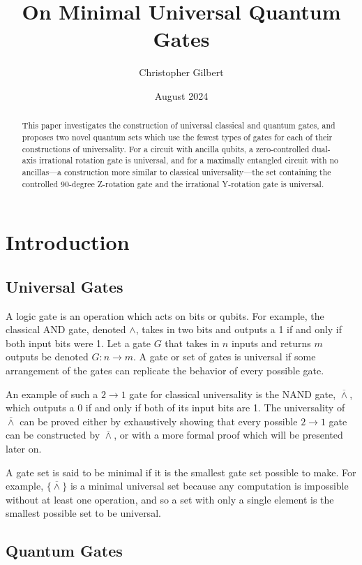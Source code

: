 \documentclass[12pt]{article}
\title{On Minimal Universal Quantum Gates}
\author{Christopher Gilbert}
\date{August 2024}
\begin{document}
\maketitle

\begin{abstract}
This paper investigates the construction of universal classical and quantum gates, and proposes two novel quantum sets which use the fewest types of gates for each of their constructions of universality. For a circuit with ancilla qubits, a zero-controlled dual-axis irrational rotation gate is universal, and for a maximally entangled circuit with no ancillas—a construction more similar to classical universality—the set containing the controlled 90-degree Z-rotation gate and the irrational Y-rotation gate is universal.
\end{abstract}

\section{Introduction}

\subsection{Universal Gates}
A logic gate is an operation which acts on bits or qubits. For example, the classical AND gate, denoted $\land$, takes in two bits and outputs a 1 if and only if both input bits were 1. Let a gate $G$ that takes in $n$ inputs and returns $m$ outputs be denoted $G : n \to m$. A gate or set of gates is universal if some arrangement of the gates can replicate the behavior of every possible gate.

An example of such a $2 \to 1$ gate for classical universality is the NAND gate, $\overline{\land}$, which outputs a 0 if and only if both of its input bits are 1. The universality of $\overline{\land}$ can be proved either by exhaustively showing that every possible $2 \to 1$ gate can be constructed by $\overline{\land}$, or with a more formal proof which will be presented later on.

A gate set is said to be minimal if it is the smallest gate set possible to make. For example, $\{ \overline{\land} \}$ is a minimal universal set because any computation is impossible without at least one operation, and so a set with only a single element is the smallest possible set to be universal.

\subsection{Quantum Gates}
\end{document}
